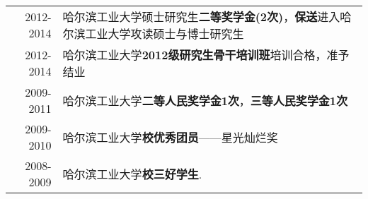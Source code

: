 %
%




\begin{tabular}{rl}	
	2012-2014 & 哈尔滨工业大学硕士研究生\textbf{二等奖学金(2次)}，\textbf{保送}进入哈尔滨工业大学攻读硕士与博士研究生 \\
	2012-2014 & 哈尔滨工业大学\textbf{2012级研究生骨干培训班}培训合格，准予结业 \\
	2009-2011 & 哈尔滨工业大学\textbf{二等人民奖学金1次}，\textbf{三等人民奖学金1次}\\
	2009-2010 & 哈尔滨工业大学\textbf{校优秀团员}——星光灿烂奖\\
	2008-2009 & 哈尔滨工业大学\textbf{校三好学生}.	
\end{tabular}

